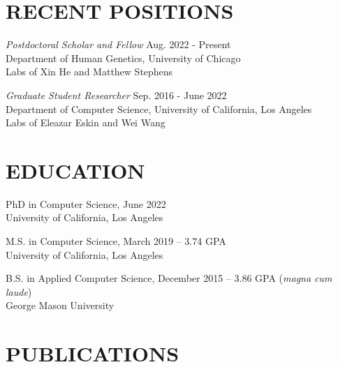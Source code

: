 \documentclass[margin, 10pt]{res} %
\begin{document}
\begin{resume}


\section{RECENT POSITIONS}

{\sl Postdoctoral Scholar and Fellow} \hfill Aug. 2022 - Present \\ Department of Human Genetics, University of Chicago \\ Labs of Xin He and Matthew Stephens

{\sl Graduate Student Researcher} \hfill Sep. 2016 - June 2022 \\ Department of Computer Science, University of California, Los Angeles \\ Labs of Eleazar Eskin and Wei Wang



\section{EDUCATION}

PhD in Computer Science, June 2022 \\
University of California, Los Angeles

M.S. in Computer Science, March 2019 -- 3.74 GPA \\
University of California, Los Angeles

B.S. in Applied Computer Science, December 2015 -- 3.86 GPA ({\sl magna cum laude}) \\
George Mason University
  

\section{PUBLICATIONS}


\end{resume}
\end{document}
